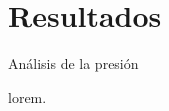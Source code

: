 \section{Resultados}

\begin{frame}{Análisis de la presión}
    \begin{block}{lorem.}

    \end{block}
\end{frame}
